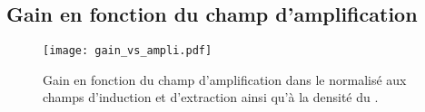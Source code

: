     \subsection{Gain en fonction du champ d'amplification}\label{sec::result_gain}

      \begin{figure}[htbp]
        \centering
        \texttt{[image: gain\_vs\_ampli.pdf]}
        \caption[Gain en fonction du champ d'amplification]{\label{fig::gain_vs_ampli}Gain en fonction du champ d'amplification dans le \TOO{} normalisé aux champs d'induction et d'extraction ainsi qu'à la densité du \threeL{}.}
      \end{figure}
%

